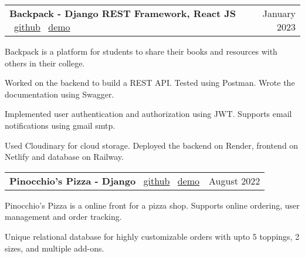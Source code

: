 \documentclass[a4paper,20pt]{article}
\makeatletter
\newcommand{\resumeSmallSubheading}[2]{
  \vspace{-1pt}\item
    \begin{tabular*}{0.97\textwidth}{l@{\extracolsep{\fill}}r}
      #1 & #2 \\
    \end{tabular*}\vspace{-8pt}
}
\makeatother
\begin{document}
    \resumeSmallSubheading{\textbf{Backpack - Django REST Framework, React JS \textbar} ~\href{https://github.com/satyamrs00/backpack/}{github} \textbar ~\href{https://main--back-backpack.netlify.app/}{demo}}{January 2023}
        
    \begin{description}[font=$\bullet$]
        \item {Backpack is a platform for students to share their books and resources with others in their college.}
    \vspace{-5pt}
        \item {Worked on the backend to build a REST API. Tested using Postman. Wrote the documentation using Swagger.}
    \vspace{-5pt}
        \item {Implemented user authentication and authorization using JWT. Supports email notifications using gmail smtp.}
    \vspace{-5pt}
        \item {Used Cloudinary for cloud storage. Deployed the backend on Render, frontend on Netlify and database on Railway.}
    \end{description}

    \vspace{-5pt}

    \resumeSmallSubheading{\textbf{Pinocchio's Pizza - Django \textbar} ~\href{https://github.com/satyamrs00/pizza/}{github} \textbar ~\href{https://pizza-uyud.onrender.com/}{demo}}{August 2022}
    
    \begin{description}[font=$\bullet$]
        \item {Pinocchio's Pizza is a online front for a pizza shop. Supports online ordering, user management and order tracking.}
    \vspace{-5pt}
        \item {Unique relational database for highly customizable orders with upto 5 toppings, 2 sizes, and multiple add-ons.}
    \end{description}
\end{document}
